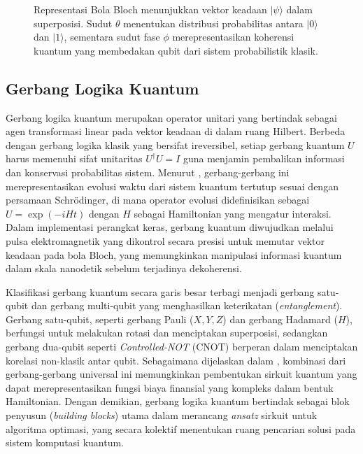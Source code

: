 \begin{figure}[h]
    \centering
    \caption{Representasi Bola Bloch menunjukkan vektor keadaan $|\psi\rangle$ dalam superposisi. Sudut $\theta$ menentukan distribusi probabilitas antara $|0\rangle$ dan $|1\rangle$, sementara sudut fase $\phi$ merepresentasikan koherensi kuantum yang membedakan qubit dari sistem probabilistik klasik.}
\end{figure}


\subsection{Gerbang Logika Kuantum}

Gerbang logika kuantum merupakan operator unitari yang bertindak sebagai agen transformasi linear pada vektor keadaan di dalam ruang Hilbert. Berbeda dengan gerbang logika klasik yang bersifat ireversibel, setiap gerbang kuantum $U$ harus memenuhi sifat unitaritas $U^\dagger U = I$ guna menjamin pembalikan informasi dan konservasi probabilitas sistem. Menurut \cite{preskill_2018}, gerbang-gerbang ini merepresentasikan evolusi waktu dari sistem kuantum tertutup sesuai dengan persamaan Schrödinger, di mana operator evolusi didefinisikan sebagai $U = \exp(-iHt)$ dengan $H$ sebagai Hamiltonian yang mengatur interaksi. Dalam implementasi perangkat keras, gerbang kuantum diwujudkan melalui pulsa elektromagnetik yang dikontrol secara presisi untuk memutar vektor keadaan pada bola Bloch, yang memungkinkan manipulasi informasi kuantum dalam skala nanodetik sebelum terjadinya dekoherensi.

Klasifikasi gerbang kuantum secara garis besar terbagi menjadi gerbang satu-qubit dan gerbang multi-qubit yang menghasilkan keterikatan (\textit{entanglement}). Gerbang satu-qubit, seperti gerbang Pauli ($X, Y, Z$) dan gerbang Hadamard ($H$), berfungsi untuk melakukan rotasi dan menciptakan superposisi, sedangkan gerbang dua-qubit seperti \textit{Controlled-NOT} (CNOT) berperan dalam menciptakan korelasi non-klasik antar qubit. Sebagaimana dijelaskan dalam \cite{mitarai_2018}, kombinasi dari gerbang-gerbang universal ini memungkinkan pembentukan sirkuit kuantum yang dapat merepresentasikan fungsi biaya finansial yang kompleks dalam bentuk Hamiltonian. Dengan demikian, gerbang logika kuantum bertindak sebagai blok penyusun (\textit{building blocks}) utama dalam merancang \textit{ansatz} sirkuit untuk algoritma optimasi, yang secara kolektif menentukan ruang pencarian solusi pada sistem komputasi kuantum.

